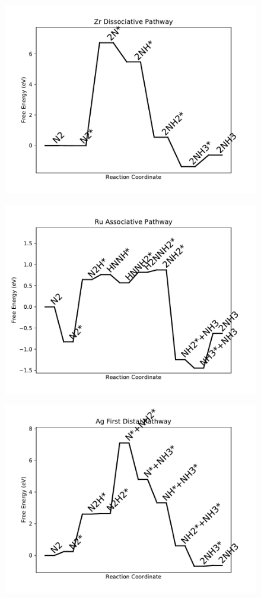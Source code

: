 \begin{figure}
\includegraphics[width=0.8\linewidth]{data/plots/Zr_dissociative.pdf}
\end{figure}

\begin{figure}
\includegraphics[width=0.8\linewidth]{data/plots/Ru_associative.pdf}
\end{figure}

\begin{figure}
\includegraphics[width=0.8\linewidth]{data/plots/Ag_distal_1.pdf}
\end{figure}

